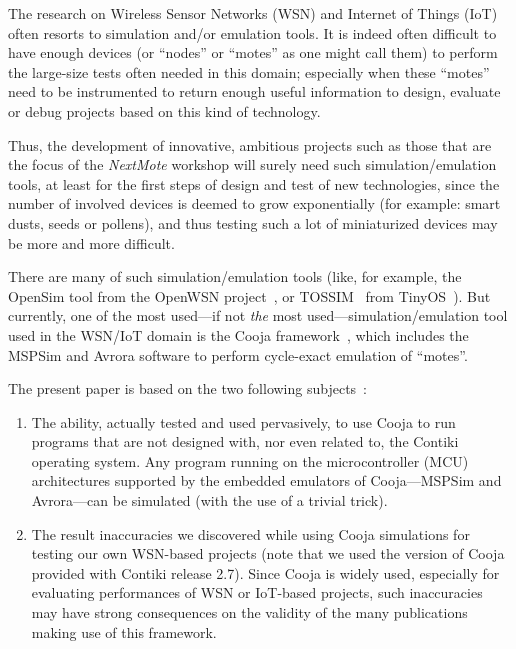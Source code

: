 \documentclass[10pt,emptycopyrightspace]{ewsn-proc}
\begin{document}
The research on Wireless Sensor Networks (WSN) and Internet of Things (IoT)
often resorts to simulation and/or emulation tools. It is indeed often
difficult to have enough devices (or ``nodes'' or ``motes'' as one might
call them) to perform the large-size tests often needed in this domain;
especially when these ``motes'' need to be instrumented to return enough
useful information to design, evaluate or debug projects based on this
kind of technology.

Thus, the development of innovative, ambitious projects such as those
that are the focus of the \emph{NextMote} workshop will surely need
such simulation/emulation tools, at least for the first steps of design
and test of new technologies, since the number of involved devices is
deemed to grow exponentially (for example: smart dusts, seeds or pollens),
and thus testing such a lot of miniaturized devices may be more and more
difficult.

There are many of such simulation/emulation tools (like, for example,
the OpenSim tool from the OpenWSN project~\cite{OpenWSN}, or
TOSSIM~\cite{TOSSIM} from TinyOS~\cite{TinyOS}). But currently,
one of the most used---if not \emph{the} most used---simulation/emulation
tool used in the WSN/IoT domain is the Cooja framework~\cite{Cooja}, which
includes the MSPSim and Avrora software to perform cycle-exact emulation
of ``motes''.

\medskip

The present paper is based on the two following subjects~:
\begin{enumerate}

\item The ability, actually tested and used pervasively, to use Cooja
to run programs that are not designed with, nor even related to, the
Contiki operating system. Any program running on the microcontroller
(MCU) architectures supported by the embedded emulators of Cooja---MSPSim
and Avrora---can be simulated (with the use of a trivial trick).

\item The result inaccuracies we discovered while using Cooja simulations
for testing our own WSN-based projects (note that we used the version of
Cooja provided with Contiki release 2.7). Since Cooja is widely used,
 especially for evaluating performances of WSN or IoT-based projects,
such inaccuracies may have strong consequences on the validity of
the many publications making use of this framework.

\end{enumerate}
\end{document}
